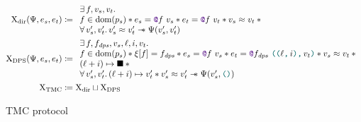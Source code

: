 \begin{figure}[tp]
    \begin{align*}
            \Chi_\mathrm{dir} (\Psi, e_s, e_t)
            &\coloneqq
            \begin{array}{l}
                    \exists f, v_s, v_t \ldotp
                \\
                    f \in \dom{p_s} \iSep
                    e_s = \lambdCall{\lambdFunc{f}}{v_s} \iSep
                    e_t = \lambdCall{\lambdFunc{f}}{v_t} \iSep
                    v_s \iSimilar v_t \iSep {}
                \\
                    \forall v_s', v_t' \ldotp
                    v_s' \iSimilar v_t' \iSepImp
                    \Psi (v_s', v_t')
            \end{array}
        \\
            \Chi_\mathrm{DPS} (\Psi, e_s, e_t)
            &\coloneqq
            \begin{array}{l}
                    \exists f, f_\mathit{dps}, v_s, \loc, i, v_t \ldotp
                \\
                    f \in \dom{p_s} \iSep
                    \xi [f] = f_\mathit{dps} \iSep
                    e_s = \lambdCall{\lambdFunc{f}}{v_s} \iSep
                    e_t = \lambdCall{\lambdFunc{f_\mathit{dps}}}{\lambdPair{\lambdPair{\loc}{i}}{v_t}} \iSep
                    v_s \iSimilar v_t \iSep {}
                \\
                    (\loc + i) \mapsto \lambdHole \iSep {}
                \\
                    \forall v_s', v_t' \ldotp
                    (\loc + i) \mapsto v_t' \iSep
                    v_s' \iSimilar v_t' \iSepImp
                    \Psi (v_s', \lambdUnit)
            \end{array}
        \\
            \Chi_\mathrm{TMC}
            &\coloneqq
            \Chi_\mathrm{dir} \sqcup \Chi_\mathrm{DPS}
    \end{align*}
    \caption{TMC protocol}
    \label{fig:protocol}
\end{figure}